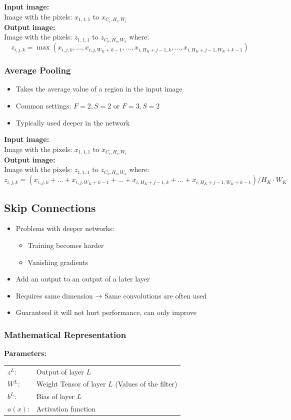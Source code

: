 \documentclass[10pt,a4paper]{article}
\newcommand{\props}{$\circ$}
\newcommand{\iprops}{\item[\props]}
\begin{document}
\textbf{Input image:} \\
Image with the pixels: $x_{1,1,1}$ to $x_{C_i,H_i,W_i}$ \\

\textbf{Output image:} \\
Image with the pixels: $z_{1,1,1}$ to $z_{C_o, H_o, W_o}$ where:
$$
	z_{i,j,k} = \max (x_{i,j,k}, \dots, x_{i,j,W_K + k - 1}, \dots, x_{i,H_K + j - 1,k}, \dots, x_{i,H_K + j - 1, W_K + k - 1})
$$

\subsubsection{Average Pooling}
\begin{itemize}
	\item Takes the average value of a region in the input image
	\iprops Common settings: $F = 2, S = 2$ or $F = 3, S = 2$
	\iprops Typically used deeper in the network
\end{itemize}

\textbf{Input image:} \\
Image with the pixels: $x_{1,1,1}$ to $x_{C_i,H_i,W_i}$ \\

\textbf{Output image:} \\
Image with the pixels: $z_{1,1,1}$ to $z_{C_o, H_o, W_o}$ where:
$$
	z_{i,j,k} = (x_{i,j,k} + \dots + x_{i,j,W_K + k - 1} + \dots + x_{i,H_K + j - 1,k} + \dots + x_{i,H_K + j - 1, W_K + k - 1}) / H_K ⋅ W_K
$$

\subsection{Skip Connections}
\begin{itemize}
	\item Problems with deeper networks:
	\begin{itemize}
		\item Training becomes harder
		\item Vanishing gradients
	\end{itemize}
	\item Add an output to an output of a later layer
	\iprops Requires same dimension → Same convolutions are often used
	\iprops Guaranteed it will not hurt performance, can only improve
\end{itemize}

\subsubsection{Mathematical Representation}
\textbf{Parameters:} \\
\begin{tabular}{ll}
	$z^L$: & Output of layer $L$ \\
	$W^L$: & Weight Tensor of layer $L$ (Values of the filter) \\
	$b^L$: & Bias of layer $L$ \\
	$a(x)$: & Activation function
\end{tabular}
\end{document}
